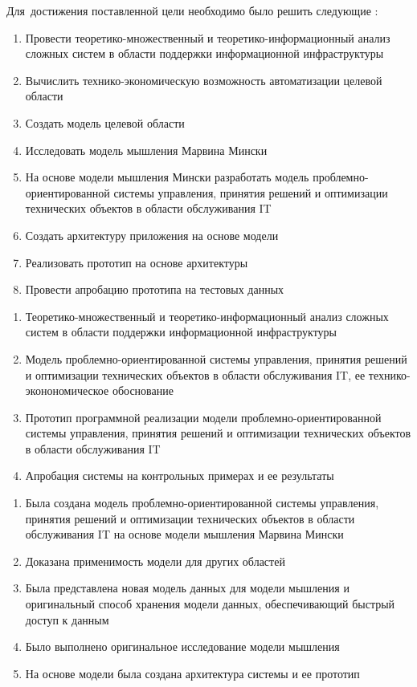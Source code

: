 Для~достижения поставленной цели необходимо было решить следующие {\tasks}:
\begin{enumerate}
  \item Провести теоретико-множественный и теоретико-информационный анализ сложных систем в области поддержки информационной инфраструктуры
  \item Вычислить технико-экономическую возможность автоматизации целевой области
  \item Создать модель целевой области
  \item Исследовать модель мышления Марвина Мински
  \item На основе модели мышления Мински разработать модель проблемно-ориентированной системы управления, принятия решений и оптимизации технических объектов в области обслуживания IT  
  \item Создать архитектуру приложения на основе модели
  \item Реализовать прототип на основе архитектуры
  \item Провести апробацию прототипа на тестовых данных
\end{enumerate}

\begin{enumerate}
  \item Теоретико-множественный и теоретико-информационный анализ сложных систем в области поддержки информационной инфраструктуры
  \item Модель проблемно-ориентированной системы управления, принятия решений и оптимизации технических объектов в области обслуживания IT, ее технико-эконономическое обоснование  
  \item Прототип программной реализации модели проблемно-ориентированной системы управления, принятия решений и оптимизации технических объектов в области обслуживания IT  
  \item Апробация системы на контрольных примерах и ее результаты
\end{enumerate}

\novelty
\begin{enumerate}
  \item Была создана модель проблемно-ориентированной системы управления, принятия решений и оптимизации технических объектов в области обслуживания IT на основе модели мышления Марвина Мински
  \item Доказана применимость модели для других областей
  \item Была представлена новая модель данных для модели мышления и оригинальный способ хранения модели данных, обеспечивающий быстрый доступ к данным
  \item Было выполнено оригинальное исследование модели мышления
  \item На основе модели была создана архитектура системы и ее прототип 
\end{enumerate}

